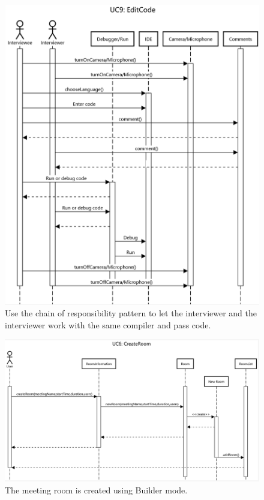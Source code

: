 \documentclass{article}
\begin{document}
\begin{figure}[H]
  \center
  \includegraphics[scale=0.21]{diagrams/UC9.png}
  \caption{Use the chain of responsibility pattern to let the interviewer and the interviewer work with the same compiler and pass code.}
\end{figure}

\begin{figure}[H]
  \center
  \includegraphics[scale=0.21]{diagrams/UC6.png}
  \caption{The meeting room is created using Builder mode.}
\end{figure}
\end{document}
